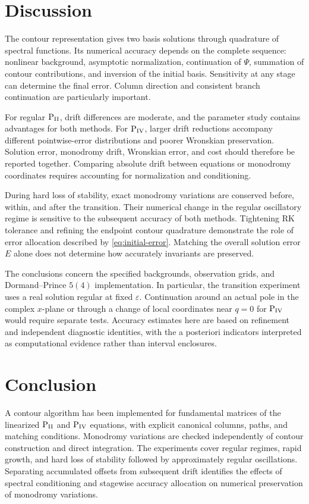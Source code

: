 \FloatBarrier
\section{Discussion}\label{sec:discussion}
The contour representation gives two basis solutions through quadrature
of spectral functions. Its numerical accuracy depends on the complete
sequence: nonlinear background, asymptotic normalization, continuation
of $\Psi$, summation of contour contributions, and inversion of the
initial basis. Sensitivity at any stage can determine the final error.
Column direction and consistent branch continuation are particularly
important.

For regular $\mathrm{P}_{\mathrm{II}}$, drift differences are moderate, and the parameter
study contains advantages for both methods. For $\mathrm{P}_{\mathrm{IV}}$, larger drift
reductions accompany different pointwise-error distributions and poorer
Wronskian preservation. Solution error, monodromy drift, Wronskian error,
and cost should therefore be reported together. Comparing absolute drift
between equations or monodromy coordinates requires accounting for
normalization and conditioning.

During hard loss of stability, exact monodromy variations are conserved
before, within, and after the transition. Their numerical change in the
regular oscillatory regime is sensitive to the subsequent accuracy of
both methods. Tightening RK tolerance and refining the endpoint contour
quadrature demonstrate the role of error allocation described by
\eqref{eq:initial-error}. Matching the overall solution error $E$ alone
does not determine how accurately invariants are preserved.

The conclusions concern the specified backgrounds, observation grids,
and Dormand--Prince $5(4)$ implementation. In particular, the transition
experiment uses a real solution regular at fixed $\varepsilon$.
Continuation around an actual pole in the complex $x$-plane or through
a change of local coordinates near $q=0$ for $\mathrm{P}_{\mathrm{IV}}$ would require
separate tests. Accuracy estimates here are based on refinement and
independent diagnostic identities, with the a posteriori indicators
interpreted as computational evidence rather than interval enclosures.

\section{Conclusion}
A contour algorithm has been implemented for fundamental matrices of
the linearized $\mathrm{P}_{\mathrm{II}}$ and $\mathrm{P}_{\mathrm{IV}}$ equations, with explicit canonical
columns, paths, and matching conditions. Monodromy variations are checked
independently of contour construction and direct integration.
The experiments cover regular regimes, rapid growth, and hard loss of
stability followed by approximately regular oscillations. Separating
accumulated offsets from subsequent drift identifies the effects of
spectral conditioning and stagewise accuracy allocation on numerical
preservation of monodromy variations.

